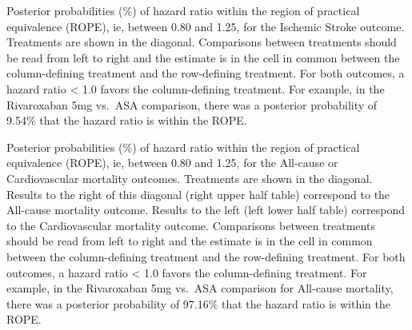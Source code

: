 \documentclass[
  12pt,
]{article}
\begin{document}
Posterior probabilities (\%) of hazard ratio within the region of
practical equivalence (ROPE), ie, between 0.80 and 1.25, for the
Ischemic Stroke outcome. Treatments are shown in the diagonal.
Comparisons between treatments should be read from left to right and the
estimate is in the cell in common between the column-defining treatment
and the row-defining treatment. For both outcomes, a hazard ratio
\textless{} 1.0 favors the column-defining treatment. For example, in
the Rivaroxaban 5mg vs.~ASA comparison, there was a posterior
probability of 9.54\% that the hazard ratio is within the ROPE.

\begin{table}[!h]

\caption{\label{tab:unnamed-chunk-49}All-cause and Cardiovascular Mortality}
\centering
{}
\end{table}

Posterior probabilities (\%) of hazard ratio within the region of
practical equivalence (ROPE), ie, between 0.80 and 1.25, for the
All-cause or Cardiovascular mortality outcomes. Treatments are shown in
the diagonal. Results to the right of this diagonal (right upper half
table) correspond to the All-cause mortality outcome. Results to the
left (left lower half table) correspond to the Cardiovascular mortality
outcome. Comparisons between treatments should be read from left to
right and the estimate is in the cell in common between the
column-defining treatment and the row-defining treatment. For both
outcomes, a hazard ratio \textless{} 1.0 favors the column-defining
treatment. For example, in the Rivaroxaban 5mg vs.~ASA comparison for
All-cause mortality, there was a posterior probability of 97.16\% that
the hazard ratio is within the ROPE.

\newpage
\end{document}
